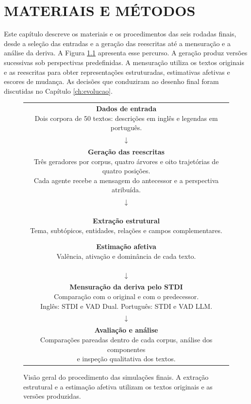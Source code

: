 \chapter{MATERIAIS E MÉTODOS}
\label{ch:metodos}

Este capítulo descreve os materiais e os procedimentos das seis rodadas finais, desde a seleção das entradas e a geração das reescritas até a mensuração e a análise da deriva. A Figura \ref{fig:metodos-visao-geral} apresenta esse percurso. A geração produz versões sucessivas sob perspectivas predefinidas. A mensuração utiliza os textos originais e as reescritas para obter representações estruturadas, estimativas afetivas e escores de mudança. As decisões que conduziram ao desenho final foram discutidas no Capítulo \ref{ch:evolucao}.

\begin{figure}[htbp]
\centering
\begin{SingleSpace}
\small
\setlength{\tabcolsep}{0pt}
\begin{tabular}{c}
\fbox{\parbox{0.88\textwidth}{\centering
\textbf{Dados de entrada}\\
Dois corpora de 50 textos: descrições em inglês e legendas em português.}}\\[0.25em]
$\downarrow$\\[0.25em]
\fbox{\parbox{0.88\textwidth}{\centering
\textbf{Geração das reescritas}\\
Três geradores por corpus, quatro árvores e oito trajetórias de quatro posições.\\
Cada agente recebe a mensagem do antecessor e a perspectiva atribuída.}}\\[0.25em]
$\downarrow$\\[0.25em]
\fbox{\parbox{0.42\textwidth}{\centering
\textbf{Extração estrutural}\\
Tema, subtópicos, entidades, relações e campos complementares.}}
\hspace{0.02\textwidth}
\fbox{\parbox{0.42\textwidth}{\centering
\textbf{Estimação afetiva}\\
Valência, ativação e dominância de cada texto.}}\\[0.25em]
$\downarrow$\\[0.25em]
\fbox{\parbox{0.88\textwidth}{\centering
\textbf{Mensuração da deriva pelo STDI}\\
Comparação com o original e com o predecessor.\\
Inglês: STDI e VAD Dual. Português: STDI e VAD LLM.}}\\[0.25em]
$\downarrow$\\[0.25em]
\fbox{\parbox{0.88\textwidth}{\centering
\textbf{Avaliação e análise}\\
Comparações pareadas dentro de cada corpus, análise dos componentes\\
e inspeção qualitativa dos textos.}}
\end{tabular}
\end{SingleSpace}
\caption{Visão geral do procedimento das simulações finais. A extração estrutural e a estimação afetiva utilizam os textos originais e as versões produzidas.}
\label{fig:metodos-visao-geral}
\end{figure}

